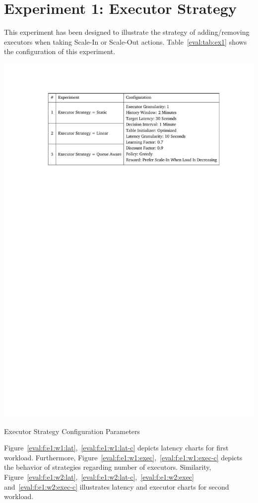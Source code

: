 \section{Experiment 1: Executor Strategy}
This experiment has been designed to illustrate the strategy of adding/removing executors when taking Scale-In or Scale-Out actions. Table~\ref{eval:tab:ex1} shows the configuration of this experiment.
\begin{table}[h]
    \includegraphics[clip,trim=3.6cm 21.18cm 2.75cm 2.5cm]{tables/ex1.pdf}
    \centering
    \caption{Executor Strategy Configuration Parameters}
    \label{eval:tab:ex1}
\end{table}

Figure~\ref{eval:f:e1:w1:lat},~\ref{eval:f:e1:w1:lat-c} depicts latency charts for first workload. Furthermore, Figure~\ref{eval:f:e1:w1:exec},~\ref{eval:f:e1:w1:exec-c} depicts the behavior of strategies regarding number of executors. Similarity, Figure~\ref{eval:f:e1:w2:lat},~\ref{eval:f:e1:w2:lat-c},~\ref{eval:f:e1:w2:exec} and~\ref{eval:f:e1:w2:exec-c} illustrates latency and executor charts for second workload.

